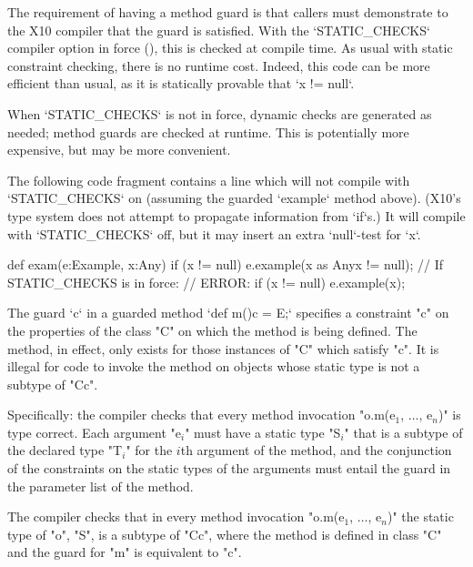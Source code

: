 The requirement of having a method guard 
is that callers must demonstrate to
the X10
compiler that the guard is satisfied.  
With the \xcd`STATIC_CHECKS` compiler option in force (), this is
checked at compile time. 
As usual with static constraint
checking, there is no runtime cost.  Indeed, this code can be more efficient
than usual, as it is statically provable that \xcd`x != null`.

When \xcd`STATIC_CHECKS` is not in force, dynamic checks are generated as
needed; method guards are checked at runtime. This is potentially more
expensive, but may be more convenient. 

\begin{ex}
The following code fragment contains a line which will not compile 
with \xcd`STATIC_CHECKS` on (assuming the guarded \xcd`example` method above).  (X10's type system does not attempt to propagate 
information from \xcd`if`s.)  It will compile with \xcd`STATIC_CHECKS` off,
but it may insert an extra \xcd`null`-test for \xcd`x`.  
\begin{xten}
  def exam(e:Example, x:Any) {
    if (x != null) 
       e.example(x as Any{x != null});
       // If STATIC_CHECKS is in force: 
       // ERROR: if (x != null) e.example(x); 
  }
\end{xten}
\end{ex}


The guard \xcd`{c}` 
in a guarded method 
\xcd`def m(){c} = E;`
specifies a constraint \xcd"c" on the
properties of the class \xcd"C" on which the method is being defined. The
method, in effect, only exists  for those instances of \xcd"C" which satisfy
\xcd"c".  It is 
illegal for code to invoke the method on objects whose static type is
not a subtype of \xcd"C{c}".

Specifically: 
    the compiler checks that every method invocation
    \xcdmath"o.m(e$_1$, $\dots$, e$_n$)"
    is type correct. Each argument
    \xcdmath"e$_i$" must have a
    static type \xcdmath"S$_i$" that is a subtype of the declared type
    \xcdmath"T$_i$" for the $i$th
    argument of the method, and the conjunction of the constraints on the
    static types 
    of the arguments must entail the guard in the parameter list
    of the method.

    The compiler checks that in every method invocation
    \xcdmath"o.m(e$_1$, $\dots$, e$_n$)"
    the static type of \xcd"o", \xcd"S", is a subtype of \xcd"C{c}", where the method
    is defined in class \xcd"C" and the guard for \xcd"m" is equivalent to
    \xcd"c".


